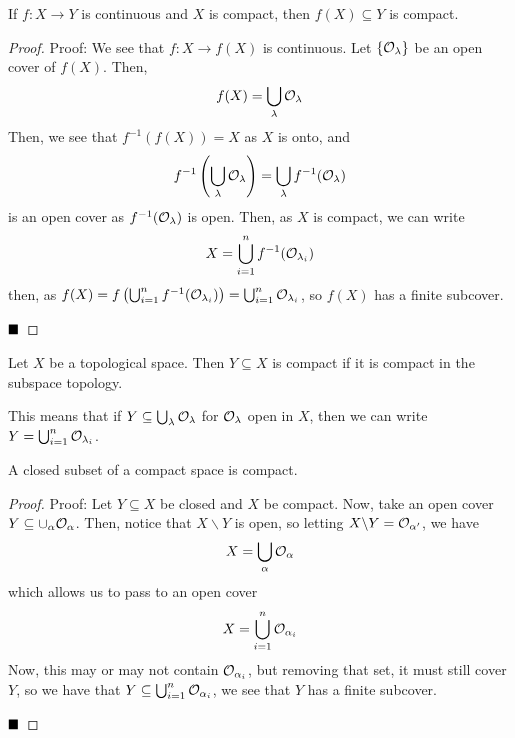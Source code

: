 
\begin{lemma}
    If $f : X \to Y$ is continuous and $X$ is compact, then $f(X) \subseteq Y$ is compact. 
\end{lemma}
\begin{proof}{Proof:}
    We see that $f : X \to f(X)$ is continuous. Let $\{\cal{O}_{\lambda}\}$ be an open cover of $f(X)$. Then, 
    \[ f(X) = \bigcup_{\lambda} \cal{O}_{\lambda} \]
    Then, we see that $f^{-1}(f(X)) = X$ as $X$ is onto, and
    \[ f^{-1}\left(\bigcup_{\lambda} \cal{O}_{\lambda}\right) = \bigcup_{\lambda} f^{-1}(\cal{O}_{\lambda}) \]
    is an open cover as $f^{-1}(\cal{O}_{\lambda})$ is open. Then, as $X$ is compact, we can write
    \[ X = \bigcup_{i = 1}^{n} f^{-1}(\cal{O}_{\lambda_i}) \]
    then, as $f(X) = f\left(\bigcup_{i = 1}^{n} f^{-1}(\cal{O}_{\lambda_i})\right) = \bigcup_{i = 1}^{n} \cal{O}_{\lambda_i}$, so $f(X)$ has a finite subcover.

    $\qed$
\end{proof}

\begin{definition}
    Let $X$ be a topological space. Then $Y \subseteq X$ is compact if it is compact in the subspace topology.
\end{definition}
This means that if $Y \subseteq \bigcup_{\lambda} \cal{O}_{\lambda}$ for $\cal{O}_{\lambda}$ open in $X$, then we can write $Y = \bigcup_{i = 1}^{n} \cal{O}_{\lambda_i}$.\\

\begin{lemma}
    A closed subset of a compact space is compact.
\end{lemma}
\begin{proof}{Proof:}
    Let $Y \subseteq X$ be closed and $X$ be compact. Now, take an open cover $Y \subseteq \cup_{\alpha} \cal{O}_{\alpha}$. Then, notice that $X \backslash Y$ is open, so letting $X \backslash Y = \cal{O}_{\alpha'}$, we have
    \[ X = \bigcup_{\alpha} \cal{O}_{\alpha} \]
    which allows us to pass to an open cover
    \[ X = \bigcup_{i = 1}^{n} \cal{O}_{\alpha_i} \]
    Now, this may or may not contain $\cal{O}_{\alpha_i}$, but removing that set, it must still cover $Y$, so we have that $Y \subseteq \bigcup_{i = 1}^{n} \cal{O}_{\alpha_i}$, we see that $Y$ has a finite subcover.

    $\qed$
\end{proof}

